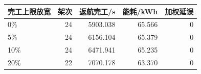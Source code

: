 \begin{tabular}{lrrrr}
\toprule
完工上限放宽 & 架次 & 返航完工/s & 能耗/kWh & 加权延误 \\
\midrule
0\% & 24 & 5903.038 & 65.566 & 0 \\
5\% & 24 & 6156.104 & 65.379 & 0 \\
10\% & 24 & 6471.941 & 65.235 & 0 \\
20\% & 22 & 7070.178 & 63.370 & 0 \\
\bottomrule
\end{tabular}
